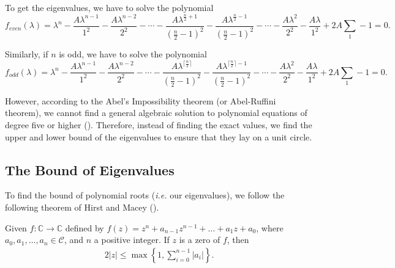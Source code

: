 To get the eigenvalues, we have to solve the polynomial
\begin{equation}
f_{even}(\lambda) = \lambda^{n} - \frac{A\lambda^{n-1}}{1^2} - \frac{A\lambda^{n-2}}{2^2} - \cdots  - \frac{A\lambda^{\frac{n}{2}+1}}{(\frac{n}{2}-1)^2} - \frac{A\lambda^{\frac{n}{2}-1}}{(\frac{n}{2}-1)^2} - \cdots - \frac{A\lambda^{2}}{2^2}  - \frac{A\lambda}{1^2} + 2A\sum\limits_{1} - 1 = 0.
\label{eq:even_polynomial}
\end{equation}

Similarly, if $n$ is odd, we have to solve the polynomial
\begin{equation}
f_{odd}(\lambda) = \lambda^{n} - \frac{A\lambda^{n-1}}{1^2} - \frac{A\lambda^{n-2}}{2^2} - \cdots  - \frac{A\lambda^{\lceil\frac{n}{2}\rceil}}{(\frac{n}{2}-1)^2} - \frac{A\lambda^{\lceil\frac{n}{2}\rceil-1}}{(\frac{n}{2}-1)^2} - \cdots - \frac{A\lambda^{2}}{2^2}  - \frac{A\lambda}{1^2} + 2A\sum\limits_{1} - 1 = 0.
\label{eq:odd_polynomial}
\end{equation}

However, according to the Abel's Impossibility theorem (or Abel-Ruffini theorem), we cannot find a general algebraic solution to polynomial equations of degree five or higher (\cite{abel}). Therefore, instead of finding the exact values, we find the upper and lower bound of the eigenvalues to ensure that they lay on a unit circle.

\subsection{The Bound of Eigenvalues}
\label{sec:bound}
To find the bound of polynomial roots (\textit{i.e.} our eigenvalues), we follow the following theorem of Hirst and Macey (\cite{hirst97}).
\begin{thm}
Given $f: \mathbb{C} \rightarrow \mathbb{C}$ defined by $f(z) = z^n + a_{n-1}z^{n-1} + \hdots + a_{1}z + a_0$, where $a_0, a_1, \hdots , a_n \in \mathcal{C}$, and $n$ a positive integer. If $z$ is a zero of $f$, then
\begin{alignat}{2}
|z| \leq \max \left\{1,\sum_{i=0}^{n-1}|a_i|\right\}. \nonumber
\end{alignat}
\end{thm}

